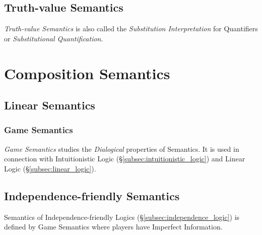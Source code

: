 \subsection{Truth-value Semantics}

\emph{Truth-value Semantics} is also called the \emph{Substitution
  Interpretation} for Quantifiers or \emph{Substitutional
  Quantification}.



\section{Composition Semantics}

\subsection{Linear Semantics}

\subsubsection{Game Semantics}

\emph{Game Semantics} studies the \emph{Dialogical} properties of
Semantics. It is used in connection with Intuitionistic Logic
(\S\ref{subsec:intuitionistic_logic}) and Linear Logic
(\S\ref{subsec:linear_logic}).

\subsection{Independence-friendly Semantics}

Semantics of Independence-friendly Logics
(\S\ref{subsec:independence_logic}) is defined by Game Semantics where
players have Imperfect Information.

